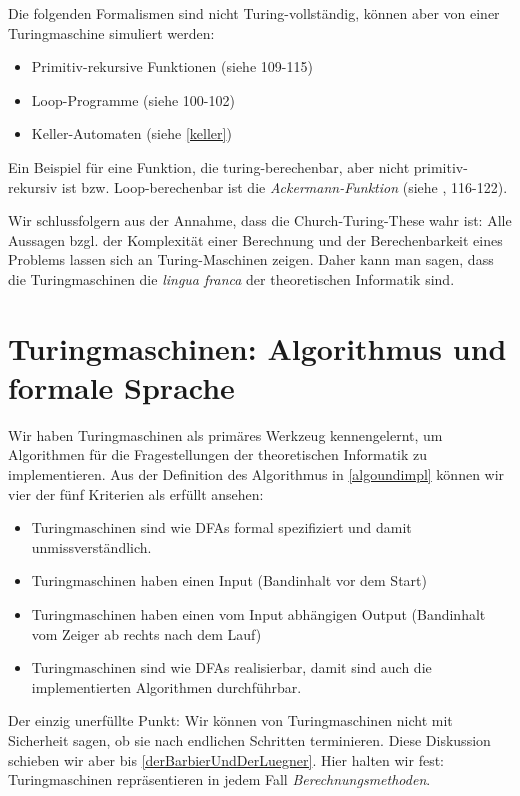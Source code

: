 Die folgenden Formalismen sind nicht Turing-vollständig,
können aber von einer Turingmaschine simuliert werden:
\begin{itemize}
    \item Primitiv-rekursive Funktionen (siehe \cite{schoening} 109-115)
    \item Loop-Programme (siehe \cite{schoening} 100-102)
    \item Keller-Automaten (siehe \autoref{keller})
\end{itemize}
Ein Beispiel für eine Funktion,
die turing-berechenbar, aber nicht primitiv-rekursiv ist bzw. Loop-berechenbar
ist die \emph{Ackermann-Funktion} (siehe \cite{schoening}, 116-122).

Wir schlussfolgern aus der Annahme,
dass die Church-Turing-These wahr ist:
Alle Aussagen bzgl. der Komplexität einer Berechnung und der Berechenbarkeit eines Problems
lassen sich an Turing-Maschinen zeigen.
Daher kann man sagen,
dass die Turingmaschinen die \emph{lingua franca} der theoretischen Informatik sind.

\section{Turingmaschinen: Algorithmus und formale Sprache}
Wir haben Turingmaschinen als primäres Werkzeug kennengelernt,
um Algorithmen für die Fragestellungen der theoretischen Informatik zu implementieren.
Aus der Definition des Algorithmus in \autoref{algoundimpl}
können wir vier der fünf Kriterien als erfüllt ansehen:
\begin{itemize}
    \item Turingmaschinen sind wie DFAs formal spezifiziert und damit unmissverständlich.
    \item Turingmaschinen haben einen Input (Bandinhalt vor dem Start)
    \item Turingmaschinen haben einen vom Input abhängigen Output
        (Bandinhalt vom Zeiger ab rechts nach dem Lauf)
    \item Turingmaschinen sind wie DFAs realisierbar,
        damit sind auch die implementierten Algorithmen durchführbar.
\end{itemize}
Der einzig unerfüllte Punkt:
Wir können von Turingmaschinen nicht mit Sicherheit sagen,
ob sie nach endlichen Schritten terminieren.
Diese Diskussion schieben wir aber bis \autoref{derBarbierUndDerLuegner}.
Hier halten wir fest: Turingmaschinen repräsentieren in jedem Fall \emph{Berechnungsmethoden}.

